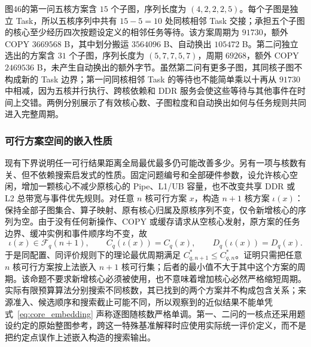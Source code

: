 图46的第一问五核方案含 $15$ 个子图，序列长度为 $(4,2,2,2,5)$。每个子图是独立 Task，所以五核序列中共有 $15-5=10$ 处同核相邻 Task 交接；承担五个子图的核心至少经历四次按题设定义的相邻任务等待。该方案周期为 $91730$，额外 COPY $3669568$ B，其中划分搬运 $3564096$ B、自动换出 $105472$ B。第二问独立选出的方案含 $31$ 个子图，序列长度为 $(5,7,7,5,7)$，周期 $69268$，额外 COPY $2469536$ B，未产生自动换出的额外字节。虽然第二问有更多子图，其同核子图不构成新的 Task 边界；第一问同核相邻 Task 的等待也不能简单乘以十再从 $91730$ 中相减，因为五核并行执行、跨核依赖和 DDR 服务会使这些等待与其他事件在时间上交错。两例分别展示了有效核心数、子图粒度和自动换出如何与任务规则共同进入完整周期。

\subsubsection{可行方案空间的嵌入性质}
现有下界说明任一可行结果距离全局最优最多仍可能改善多少。另有一项与核数有关、但不依赖搜索启发式的性质。固定问题编号和全部硬件参数，设允许核心空闲，增加一颗核心不减少原核心的 Pipe、L1/UB 容量，也不改变共享 DDR 或 L2 总带宽与事件优先规则。对任意 $n$ 核可行方案 $x$，构造 $n+1$ 核方案 $\iota(x)$：保持全部子图集合、算子映射、原有核心归属及原核序列不变，仅令新增核心的序列为空。由于没有任何新操作、COPY 或缓存请求从空核心发射，原方案的任务边界、缓冲实例和事件顺序均不变，故
\begin{equation}
 \iota(x)\in\mathcal F_q(n+1),\qquad
 C_q(\iota(x))=C_q(x),\qquad D_q(\iota(x))=D_q(x).
 \label{eq:core_embedding}
\end{equation}
于是同配置、同评价规则下的理论最优周期满足 $C_{q,n+1}^{*}\le C_{q,n}^{*}$。证明只需把任意 $n$ 核可行方案按上法嵌入 $n+1$ 核可行集；后者的最小值不大于其中这个方案的周期。该命题不要求新增核心必须被使用，也不意味着增加核心必然严格缩短周期。实际有限预算算法分别搜索不同核数，其已找到的两个方案并不构成包含关系；来源准入、候选顺序和搜索截止可能不同，所以观察到的近似结果不能单凭式~\eqref{eq:core_embedding} 声称逐图随核数严格单调。第一、二问的一核点还采用题设约定的原始整图参考，跨这一特殊基准解释时应使用实际统一评价定义，而不是把约定点误作上述嵌入构造的搜索输出。
